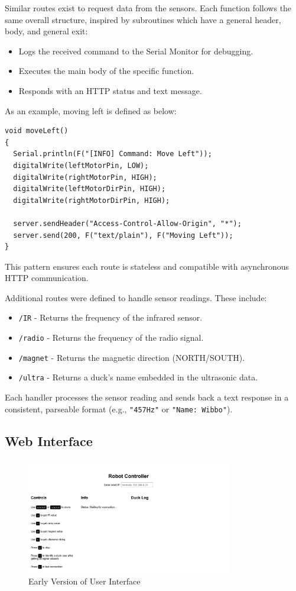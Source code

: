 Similar routes exist to request data from the sensors. Each function follows the same overall structure, inspired by subroutines which have a general header, body, and general exit:
\begin{itemize}
  \item Logs the received command to the Serial Monitor for debugging.
  \item Executes the main body of the specific function.
  \item Responds with an HTTP status and text message.
\end{itemize}

As an example, moving left is defined as below:

\begin{verbatim}
void moveLeft()
{
  Serial.println(F("[INFO] Command: Move Left"));
  digitalWrite(leftMotorPin, LOW);
  digitalWrite(rightMotorPin, HIGH);
  digitalWrite(leftMotorDirPin, HIGH);
  digitalWrite(rightMotorDirPin, HIGH);

  server.sendHeader("Access-Control-Allow-Origin", "*");
  server.send(200, F("text/plain"), F("Moving Left"));
}
\end{verbatim}

This pattern ensures each route is stateless and compatible with asynchronous HTTP communication.

Additional routes were defined to handle sensor readings. These include:
\begin{itemize}
  \item \texttt{/IR} - Returns the frequency of the infrared sensor.
  \item \texttt{/radio} - Returns the frequency of the radio signal.
  \item \texttt{/magnet} - Returns the magnetic direction (NORTH/SOUTH).
  \item \texttt{/ultra} - Returns a duck’s name embedded in the ultrasonic data.
\end{itemize}

Each handler processes the sensor reading and sends back a text response in a consistent, parseable format (e.g., \texttt{"457Hz"} or \texttt{"Name: Wibbo"}).

\subsection*{Web Interface}
\begin{figure}[h]
  \centering
  \includegraphics[width=0.8\textwidth]{subpages/images/early_web_interface.png}
  \caption{Early Version of User Interface}
  \label{fig:early_web_interface}
\end{figure}

